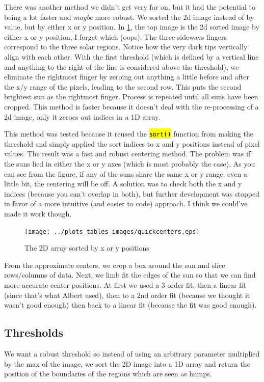 \documentclass[10pt]{scrartcl}
\begin{document}
There was another method we didn't get very far on, but it had the potential to being a lot faster and \emph{maybe} more robust. We sorted the 2d image instead of by value, but by either x or y position. In \cref{sortsort}, the top image is the 2d sorted image by either x or y position, I forget which (oops). The three sideways fingers correspond to the three solar regions. Notice how the very dark tips vertically align with each other. With the first threshold (which is defined by a vertical line and anything to the right of the line is considered above the threshold), we eliminate the rightmost finger by zeroing out anything a little before and after the x/y range of the pixels, leading to the second row. This puts the second brightest sun as the rightmost finger. Process is repeated until all suns have been cropped. This method is faster because it doesn't deal with the re-processing of a 2d image, only it zeroes out indices in a 1D array. 

This method was tested because it reused the \hl{\texttt{sort()}} function from making the threshold and simply applied the sort indices to x and y positions instead of pixel values. The result was a fast and robust centering method. The problem was if the suns lied in either the x or y axes (which is most probably the case). As you can see from the figure, if any of the suns share the same x or y range, even a little bit, the centering will be off. A solution was to check both the x and y indices (because you can't overlap in both), but further development was stopped in favor of a more intuitive (and easier to code) approach. I think we could've made it work though.

\begin{figure}[!ht]
   \texttt{[image: ../plots\_tables\_images/quickcenters.eps]}%
   \caption{The 2D array sorted by x or y positions}\label{sortsort}
\end{figure}

From the approximate centers, we crop a box around the sun and slice rows/columns of data. Next, we limb fit the edges of the sun so that we can find more accurate center positions. At first we used a 3 order fit, then a linear fit (since that's what Albert used), then to a 2nd order fit (because we thought it wasn't good enough) then back to a linear fit (because the fit was good enough). 

\subsection{Thresholds} %
\label{sub:thresholds}
We want a robust threshold so instead of using an arbitrary parameter multiplied by the max of the image, we sort the 2D image into a 1D array and return the position of the boundaries of the regions which are seen as humps.
\end{document}
